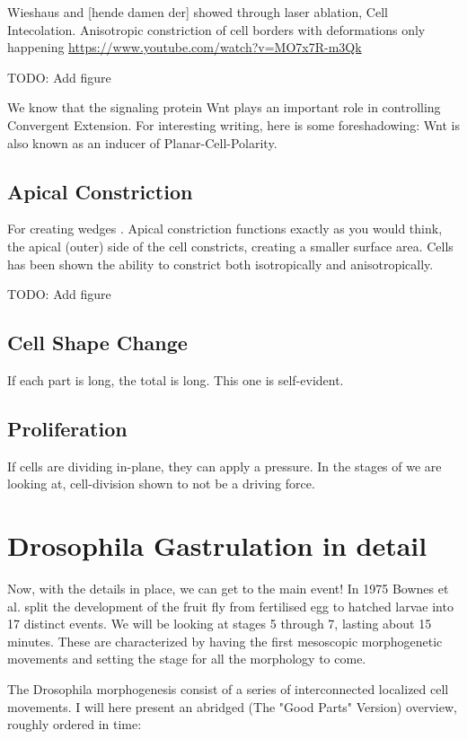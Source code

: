 Wieshaus and [hende damen der] showed through laser ablation, Cell Intecolation. Anisotropic constriction of cell borders with deformations only happening  \url{https://www.youtube.com/watch?v=MO7x7R-m3Qk}


 TODO: Add figure

We know that the signaling protein Wnt plays an important role in controlling Convergent Extension. For interesting writing, here is some foreshadowing: Wnt is also known as an inducer of Planar-Cell-Polarity.
\subsection{ Apical Constriction }
For creating wedges . Apical constriction functions exactly as you would think, the apical (outer) side of the cell constricts, creating a smaller surface area. Cells has been shown the ability to constrict both isotropically and anisotropically.

 TODO: Add figure

\subsection{Cell Shape Change}
If each part is long, the total is long. This one is self-evident.
\subsection{Proliferation}
If cells are dividing in-plane, they can apply a pressure. In the stages of we are looking at, cell-division shown to not be a driving force.


\section{Drosophila Gastrulation in detail}
Now, with the details in place, we can get to the main event!
In 1975 Bownes et al. split the development of the fruit fly from fertilised egg to hatched larvae into 17 distinct events. \cite{bownes1975photographic} We will be looking at stages 5 through 7, lasting about 15 minutes. These are characterized by having the first mesoscopic morphogenetic movements and setting the stage for all the morphology to come. 

The Drosophila morphogenesis consist of a series of interconnected localized cell movements. I will here present an abridged (The "Good Parts" Version) overview, roughly ordered in time:
\newpage

